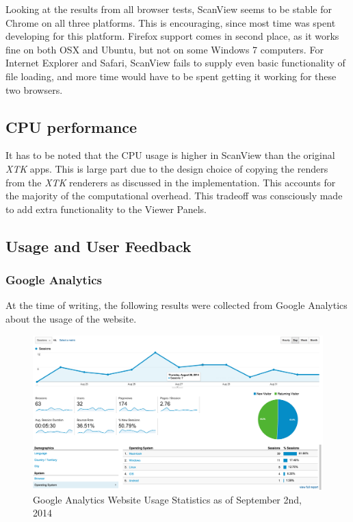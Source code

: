 \documentclass[a4paper,11pt,twoside]{article}
\begin{document}
Looking at the results from all browser tests, ScanView seems to be stable for Chrome on all three platforms. This is encouraging, since most time was spent developing for this platform. Firefox support comes in second place, as it works fine on both OSX and Ubuntu, but not on some Windows 7 computers. For Internet Explorer and Safari, ScanView fails to supply even basic functionality of file loading, and more time would have to be spent getting it working for these two browsers.


\subsection{CPU performance}

It has to be noted that the CPU usage is higher in ScanView than the original \textit{XTK} apps. This is large part due to the design choice of copying the renders from the \textit{XTK} renderers as discussed in the implementation. This accounts for the majority of the computational overhead. This tradeoff was consciously made to add extra functionality to the Viewer Panels.


\subsection{Usage and User Feedback}

\subsubsection{Google Analytics}

At the time of writing, the following results were collected from Google Analytics about the usage of the website.

\begin{figure}[ht!]
\centering
\includegraphics[width=160mm]{graphics/resultsAnalytics_01.png}
\caption{Google Analytics Website Usage Statistics as of September 2nd, 2014}
\label{fig:UIdesign1}
\end{figure}
\end{document}
